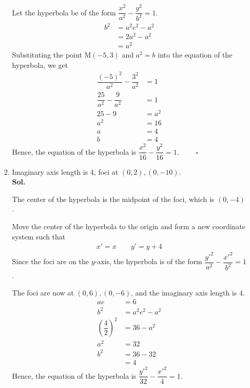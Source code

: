 \documentclass{report}
\newcommand{\sol}{\vspace{1em}\\\textbf{Sol.}}
\newcommand{\eos}{ \qquad \square}
\begin{document}
\begin{enumerate}[leftmargin=*]
\begin{enumerate}
                    Let the hyperbola be of the form $\dfrac{x^2}{a^2}-\dfrac{y^2}{b^2}=1$.
                    \begin{align*}
                        b^2 & = a^2e^2 - a^2 \\
                            & = 2a^2 - a^2   \\
                            & = a^2
                    \end{align*}
                    Substituting the point $\mathrm{M}(-5,3)$ and $a^2=b$ into the equation of the hyperbola, we get
                    \begin{align*}
                        \dfrac{(-5)^2}{a^2}-\dfrac{3^2}{a^2} & =1   \\
                        \dfrac{25}{a^2}-\dfrac{9}{a^2}       & =1   \\
                        25-9                                 & =a^2 \\
                        a^2                                  & =16  \\
                        a                                    & =4   \\
                        b                                    & =4
                    \end{align*}
                    Hence, the equation of the hyperbola is $\dfrac{x^2}{16}-\dfrac{y^2}{16}=1$. $\eos$

              \item Imaginary axis length is 4, foci at $(0,2), (0,-10)$. \sol{}

                    The center of the hyperbola is the midpoint of the foci, which is $(0,-4)$.

                    Move the center of the hyperbola to the origin and form a new coordinate system
                    such that
                    \begin{align*}
                        x' = x \qquad y' = y+4
                    \end{align*}
                    Since the foci are on the $y$-axis, the hyperbola is of the form
                    $\dfrac{y'^2}{a^2}-\dfrac{x'^2}{b^2}=1$.

                    The foci are now at $(0,6), (0,-6)$, and the imaginary axis length is 4.
                    \begin{align*}
                        ae                          & = 6            \\
                        b^2                         & = a^2e^2 - a^2 \\
                        \left(\dfrac{4}{2}\right)^2 & = 36 - a^2     \\
                        a^2                         & = 32           \\
                        b^2                         & = 36-32        \\
                                                    & = 4
                    \end{align*}
                    Hence, the equation of the hyperbola is $\dfrac{y'^2}{32}-\dfrac{x'^2}{4}=1$.


\end{enumerate}
\end{enumerate}
\end{document}
